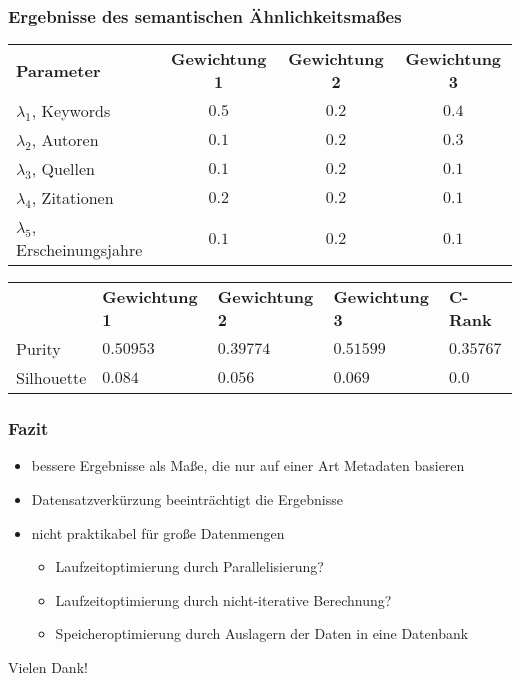 \documentclass[12pt, xcolor=table]{beamer}
\begin{document}
\begin{frame}
    \frametitle{Ergebnisse des semantischen Ähnlichkeitsmaßes}
    \scriptsize{
    \begin{table}[H]
    \centering
    \begin{tabular}{l c c c}
		\textbf{Parameter} &\textbf{Gewichtung 1} &\textbf{Gewichtung 2} &\textbf{Gewichtung 3} \\
		$\lambda_1$, Keywords & $0.5$ & $0.2$ & $0.4$\\
		$\lambda_2$, Autoren & $0.1$ & $0.2$ & $0.3$\\
		$\lambda_3$, Quellen & $0.1$ & $0.2$ & $0.1$\\
		$\lambda_4$, Zitationen & $0.2$ & $0.2$ & $0.1$\\
		$\lambda_5$, Erscheinungsjahre & $0.1$ & $0.2$ & $0.1$\\
    \end{tabular}
    \end{table}
    }
    \scriptsize{
    \begin{table}[H]
    \centering
    \begin{tabular}{l l l l l}
		     &\textbf{Gewichtung 1} &\textbf{Gewichtung 2} &\textbf{Gewichtung 3} & \textbf{C-Rank} \\
		    Purity & $0.50953$ & $0.39774$ & $0.51599$ & $0.35767$\\
    		Silhouette & $0.084$ & $0.056$ & $0.069$ & $0.0$ \\
    \end{tabular}
\end{table}
}
\end{frame}

\begin{frame}
    \frametitle{Fazit}
    \begin{itemize}
    \item bessere Ergebnisse als Maße, die nur auf einer Art Metadaten basieren
    \item Datensatzverkürzung beeinträchtigt die Ergebnisse
    \item nicht praktikabel für große Datenmengen
        \begin{itemize}
            \item Laufzeitoptimierung durch Parallelisierung?
            \item Laufzeitoptimierung durch nicht-iterative Berechnung?
            \item Speicheroptimierung durch Auslagern der Daten in eine Datenbank
        \end{itemize}
    \end{itemize}
\end{frame}

\begin{frame}
\centerline{Vielen Dank!}
\end{frame}
\end{document}
